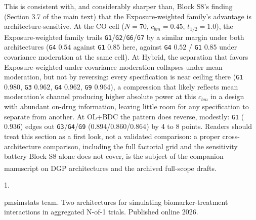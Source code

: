 \documentclass[
  11pt,
]{article}
\newlength{\cslhangindent}
\newlength{\csllabelwidth}
\newenvironment{CSLReferences}[2] %
 {\begin{list}{}{%
  \setlength{\itemindent}{0pt}
  \setlength{\leftmargin}{0pt}
  \setlength{\parsep}{0pt}
  \ifodd #1
   \setlength{\leftmargin}{\cslhangindent}
   \setlength{\itemindent}{-1\cslhangindent}
  \fi
  \setlength{\itemsep}{#2\baselineskip}}}
 {\end{list}}
\newcommand{\CSLLeftMargin}[1]{\parbox[t]{\csllabelwidth}{\strut#1\strut}}
\newcommand{\CSLRightInline}[1]{\parbox[t]{\linewidth - \csllabelwidth}{\strut#1\strut}}
\begin{document}
This is consistent with, and considerably sharper than, Block S8's
finding (Section 3.7 of the main text) that the Exposure-weighted
family's advantage is architecture-sensitive. At the CO cell
(\(N = 70\), \(c_{bm} = 0.45\), \(t_{1/2} = 1.0\)), the Exposure-weighted
family trails \texttt{G1}/\texttt{G2}/\texttt{G6}/\texttt{G7} by a similar margin under both
architectures (\texttt{G4} \(0.54\) against \texttt{G1} \(0.85\) here, against \texttt{G4}
\(0.52\) / \texttt{G1} \(0.85\) under covariance moderation at the same cell).
At Hybrid, the separation that favors Exposure-weighted under
covariance moderation collapses under mean moderation, but not by
reversing: every specification is near ceiling there (\texttt{G1} \(0.980\),
\texttt{G3} \(0.962\), \texttt{G4} \(0.962\), \texttt{G9} \(0.964\)), a compression that likely
reflects mean moderation's channel producing higher
absolute power at this \(c_{bm}\) in a design with abundant on-drug
information, leaving little room for any specification to separate
from another. At OL+BDC the pattern does reverse, modestly: \texttt{G1}
(\(0.936\)) edges out \texttt{G3}/\texttt{G4}/\texttt{G9} (\(0.894\)/\(0.860\)/\(0.864\)) by
4 to 8 points. Readers should treat this section as a first look,
not a validated comparison: a proper cross-architecture comparison,
including the full factorial grid and the sensitivity battery Block
S8 alone does not cover, is the subject of the companion manuscript
on DGP architectures\textsuperscript{} and the
archived full-scope drafts.

\protect{}\label{refs}
\begin{CSLReferences}{0}{1}
\CSLLeftMargin{1. }%
\CSLRightInline{{pmsimstats team}. Two architectures for simulating biomarker-treatment interactions in aggregated {N}-of-1 trials. Published online 2026.}

\end{CSLReferences}
\end{document}
